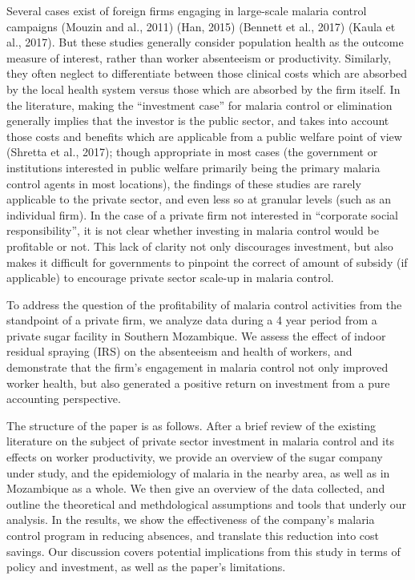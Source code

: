 \documentclass[]{article}
\begin{document}
Several cases exist of foreign firms engaging in large-scale malaria
control campaigns (Mouzin and al., 2011) (Han, 2015) (Bennett et al.,
2017) (Kaula et al., 2017). But these studies generally consider
population health as the outcome measure of interest, rather than worker
absenteeism or productivity. Similarly, they often neglect to
differentiate between those clinical costs which are absorbed by the
local health system versus those which are absorbed by the firm itself.
In the literature, making the ``investment case'' for malaria control or
elimination generally implies that the investor is the public sector,
and takes into account those costs and benefits which are applicable
from a public welfare point of view (Shretta et al., 2017); though
appropriate in most cases (the government or institutions interested in
public welfare primarily being the primary malaria control agents in
most locations), the findings of these studies are rarely applicable to
the private sector, and even less so at granular levels (such as an
individual firm). In the case of a private firm not interested in
``corporate social responsibility'', it is not clear whether investing
in malaria control would be profitable or not. This lack of clarity not
only discourages investment, but also makes it difficult for governments
to pinpoint the correct of amount of subsidy (if applicable) to
encourage private sector scale-up in malaria control.

To address the question of the profitability of malaria control
activities from the standpoint of a private firm, we analyze data during
a 4 year period from a private sugar facility in Southern Mozambique. We
assess the effect of indoor residual spraying (IRS) on the absenteeism
and health of workers, and demonstrate that the firm's engagement in
malaria control not only improved worker health, but also generated a
positive return on investment from a pure accounting perspective.

The structure of the paper is as follows. After a brief review of the
existing literature on the subject of private sector investment in
malaria control and its effects on worker productivity, we provide an
overview of the sugar company under study, and the epidemiology of
malaria in the nearby area, as well as in Mozambique as a whole. We then
give an overview of the data collected, and outline the theoretical and
methdological assumptions and tools that underly our analysis. In the
results, we show the effectiveness of the company's malaria control
program in reducing absences, and translate this reduction into cost
savings. Our discussion covers potential implications from this study in
terms of policy and investment, as well as the paper's limitations.
\end{document}
